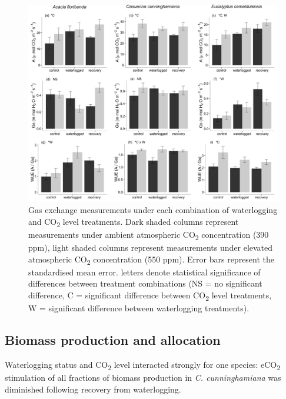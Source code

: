 \documentclass[12pt,a4paper]{memoir}
\begin{document}
\begin{figure}[ht]
\begin{center}
\includegraphics[width=\linewidth,keepaspectratio=true]{Ch5gasexchange2.png} %
\caption[Gas exchange measurements under each combination of waterlogging and CO\textsubscript{2} level treatments.]{\small{Gas exchange measurements under each combination of waterlogging and CO\textsubscript{2} level treatments. Dark shaded columns represent measurements under ambient atmospheric CO\textsubscript{2} concentration (390 ppm), light shaded columns represent measurements under elevated atmospheric CO\textsubscript{2} concentration (550 ppm). Error bars represent the standardised mean error. \newline* letters denote statistical significance of differences between treatment combinations (NS = no significant difference, C = significant difference between CO\textsubscript{2} level treatments, W = significant difference between waterlogging treatments).}} %
\label{fig:Ch5_F1} %
\end{center}
\end{figure}

\subsection*{Biomass production and allocation}
Waterlogging status and CO\textsubscript{2} level interacted strongly for one species: eCO\textsubscript{2} stimulation of all fractions of biomass production in \textit{C. cunninghamiana} was diminished following recovery from waterlogging. 
\end{document}
